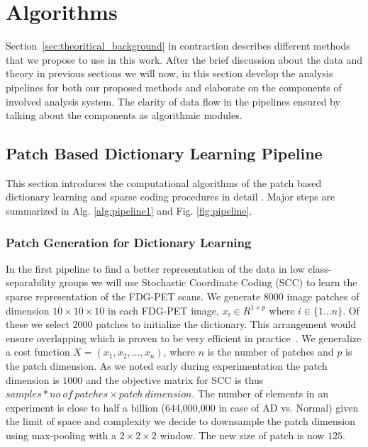 \chapter{Algorithms}
\label{chapter:algorithm}

Section~\ref{sec:theoritical_background} in contraction describes different methods that we propose to use in this work. After the brief discussion about the data and theory in previous sections we will now, in this section develop the analysis pipelines for both our proposed methods and elaborate on the components of involved analysis system. The clarity of data flow in the pipelines ensured by talking about the components as algorithmic modules.


\section{Patch Based Dictionary Learning Pipeline}
\label{sec:scc}

This section introduces the computational algorithms of the patch based dictionary learning and sparse coding procedures in detail . Major steps are summarized in Alg. \ref{alg:pipeline1} and Fig. \ref{fig:pipeline}. 

\subsection{Patch Generation for Dictionary Learning}
\label{subsec:Patch_Generation_Dictionary_Learning}
In the first pipeline to find a better representation of the data in low class-separability groups we will use Stochastic Coordinate Coding (SCC) to learn the sparse representation of the FDG-PET scans. We generate 8000 image patches of dimension $ 10 \times 10 \times 10 $ in each FDG-PET image, $ x_i \in R^{1 \times p} $ where $ i \in \{ 1 \dots n \}$. Of these we select $2000$ patches to initialize the dictionary. This arrangement would ensure overlapping which is proven to be very efficient in practice~\citep{lin2014stochastic,zhang2016applying}. We generalize a cost function $ X = (x_1,x_2,\dots,x_n) $, where $ n $ is the number of patches and $ p $ is the patch dimension. As we noted early during experimentation the patch dimension is $1000$ and the objective matrix for SCC is thus $samples*no~of~patches \times patch~dimension $. The number of elements in an experiment is close to half a billion (644,000,000 in case of AD vs. Normal) given the limit of space and complexity we decide to downsample the patch dimension using max-pooling with a $ 2 \times 2 \times 2 $ window. The new size of patch is now $ 125 $. 

